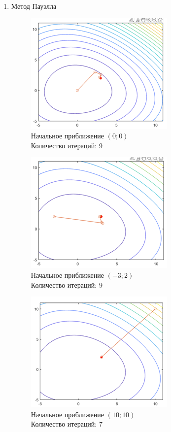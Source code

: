 \documentclass[12pt]{article}
\begin{document}
\begin{enumerate}
\begin{enumerate}
	\item Метод Пауэлла
	\begin{figure}[H]
	\begin{minipage}{.5\textwidth}
    	\centering
    	\includegraphics[]{img/f6_2_1.png}
    	\\ Начальное приближение $\left( 0; 0 \right)$
    	\\ Количество итераций: 9
	\end{minipage}
	\begin{minipage}{.5\textwidth}
    	\centering
    	\includegraphics[]{img/f6_2_2.png}
    	\\ Начальное приближение $\left( -3; 2 \right)$
    	\\ Количество итераций: 9
	\end{minipage}
    \end{figure}

	\begin{figure}[H]
    	\centering
    	\includegraphics[]{img/f6_2_3.png}
    	\\ Начальное приближение $\left( 10; 10 \right)$
    	\\ Количество итераций: 7
    \end{figure}


\end{enumerate}
\end{enumerate}
\end{document}
